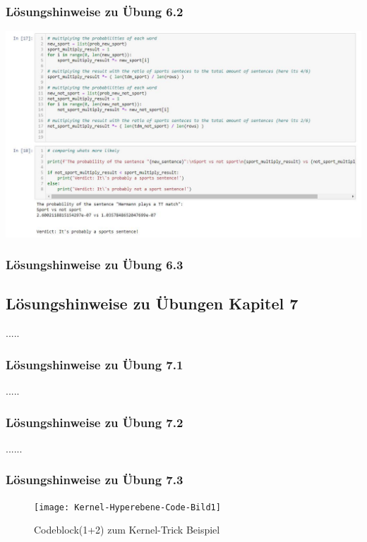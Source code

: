 \documentclass[12pt]{article}
\begin{document}
\subsubsection{Lösungshinweise zu Übung 6.2}

\begin{center} 
\includegraphics[width=1.1\textwidth]{Naive-Bayes-Ueb62_Hinweis}
\end{center}

\subsubsection{Lösungshinweise zu Übung 6.3}


\newpage

\subsection{Lösungshinweise zu Übungen Kapitel 7}
.....\\
\subsubsection{Lösungshinweise zu Übung 7.1}
.....\\
\subsubsection{Lösungshinweise zu Übung 7.2} 
...... \\[0.8cm]
\subsubsection{Lösungshinweise zu Übung 7.3}

\begin{figure}[htp]
  \centering
  \hspace*{-0.5cm} 
  \texttt{[image: Kernel-Hyperebene-Code-Bild1]}
  \caption{Codeblock(1+2) zum Kernel-Trick Beispiel}
  \label{fig:SVM_Ebenen}
\end{figure}
\end{document}
